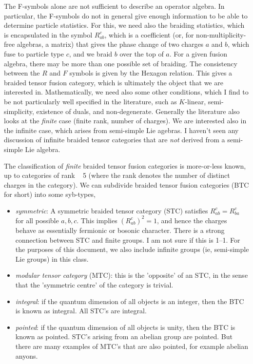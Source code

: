 \documentclass[12pt]{article}
\begin{document}
The F-symbols alone are not sufficient to describe an operator algebra.  In particular, the F-symbols
do not in general give enough information to be able to determine particle statistics. For
this, we need also the braiding statistics, which is encapsulated in the symbol $R^{c}_{ab}$, which
is a coefficient (or, for non-multiplicity-free algebras, a matrix) that gives the phase change
of two charges $a$ and $b$, which fuse to particle type $c$, and we braid $b$ over the top of $a$.
For a given fusion algebra, there may be more than one possible set of braiding. The consistency
between the $R$ and $F$ symbols is given by the Hexagon relation. This gives
a braided tensor fusion category, which is ultimately the object that we are interested in.
Mathematically, we need also some other conditions, which I find to be not particularly well specified
in the literature, such as $K$-linear, semi-simplicity, existence of duals, and non-degenerate. 
Generally the literature
also looks at the \emph{finite} case (finite rank, number of charges). We are interested also in the infinite case,
which arises from semi-simple Lie agebras. I haven't seen any discussion of infinite braided tensor
categories that are \emph{not} derived from a semi-simple Lie algebra.

The classification of \emph{finite} braided tensor fusion categories is more-or-less known, up to
categories of rank ~ 5 (where the rank denotes the number of distinct charges in the category).
We can subdivide braided tensor fusion categories (BTC for short) into some syb-types,
\begin{itemize}
\item \emph{symmetric}: A symmetric braided tensor category (STC) satisfies $R^{c}_{ab} = R^{c}_{ba}$ for
all possible $a,b,c$. This implies $(R^{c}_{ab})^2 = 1$, and hence the charges behave as essentially
fermionic or bosonic character. There is a strong connection between STC and finite groups. I am not sure
if this is 1--1. For the purposes of this document, we also include infinite groups (ie, semi-simple
Lie groups) in this class. 
\item \emph{modular tensor category} (MTC): this is the 'opposite' of an STC, in the sense that the
'symmetric centre' of the category is trivial. 
\item \emph{integral}: if the quantum dimension of all objects is an integer, then the BTC is known as integral.
All STC's are integral.
\item \emph{pointed}: if the quantum dimension of all objects is unity, then the BTC is known as pointed.
STC's arising from an abelian group are pointed. But there are many examples of MTC's that are also pointed,
for example abelian anyons.
\end{itemize}
\end{document}

